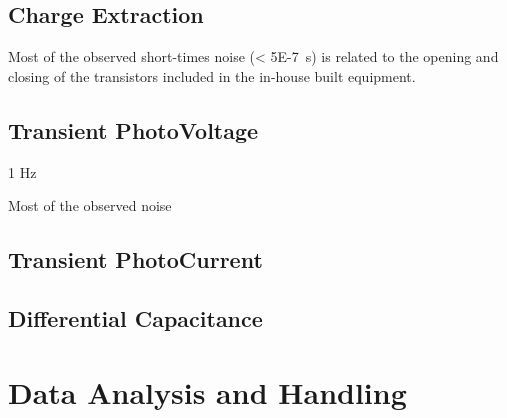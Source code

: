 	\subsection{Charge Extraction}

		Most of the observed short-times noise (\SI{< 5E-7}{\s}) is related to the opening and closing of the transistors included in the in-house built equipment.
	\subsection{Transient PhotoVoltage}
	
		1 Hz
		
		Most of the observed noise 
	

	
	\subsection{Transient PhotoCurrent}
	
	\subsection{Differential Capacitance}
	
\section{Data Analysis and Handling}



